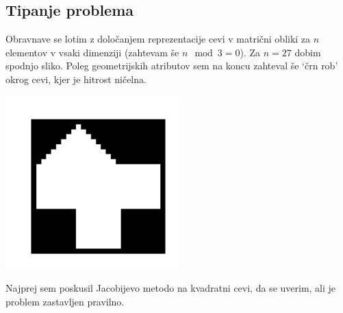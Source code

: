 \subsection{Tipanje problema}
Obravnave se lotim z določanjem reprezentacije cevi v matrični obliki za $n$ elementov v vsaki dimenziji (zahtevam še $n \mod 3 = 0$). Za $n=27$ dobim spodnjo sliko. Poleg geometrijskih atributov sem na koncu zahteval še `črn rob' okrog cevi, kjer je hitrost ničelna.
\begin{center}
    \includegraphics[width=0.5\textwidth]{../old/1-hiska.pdf}
\end{center}
Najprej sem poskusil Jacobijevo metodo na kvadratni cevi, da se uverim, ali je problem zastavljen pravilno.
